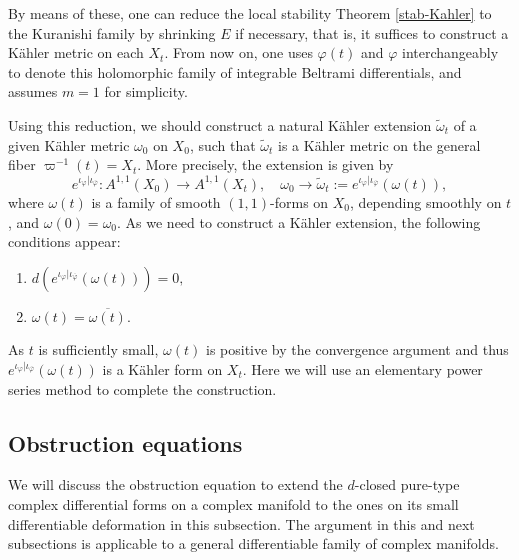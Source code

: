 \documentclass[12pt]{amsart}
\numberwithin{equation}{section}
\renewcommand{\1}{\mathds{1}}
\renewcommand{\>}{\rightarrow}
\def\o{\overline}
\begin{document}
By means of these, one can reduce the local stability Theorem \ref{stab-Kahler} to the Kuranishi family by shrinking $E$ if necessary, that is, it suffices to construct a K\"{a}hler metric on each $X_t$. From now on, one uses $\varphi(t)$ and  $\varphi$ interchangeably to denote this holomorphic family of integrable Beltrami differentials, and assumes $m=1$ for simplicity.

Using this reduction, we should
construct a natural K\"{a}hler extension $\tilde{\omega}_t$ of a given K\"{a}hler metric
$\omega_0$ on $X_0$, such that $\tilde{\omega}_t$ is a K\"{a}hler  metric on
the general fiber $\varpi^{-1}(t)=X_t$. More precisely, the extension
is given by
$$e^{\iota_{\varphi}|\iota_{\o{\varphi}}}:A^{1,1}(X_0)\to A^{1,1}(X_t),\quad \omega_0\to \tilde{\omega}_t:=e^{\iota_{\varphi}|\iota_{\o{\varphi}}}(\omega(t)),$$
where $\omega(t)$ is a family of smooth $(1,1)$-forms on $X_0$,
depending smoothly on $t$, and $\omega(0)=\omega_0$. As we need to
construct a K\"{a}hler extension, the following conditions appear:
\begin{enumerate}
  \item $d\left(e^{\iota_{\varphi}|\iota_{\o{\varphi}}}(\omega(t))\right)=0,$
  \item $\omega(t)=\o{\omega(t)}$.
\end{enumerate}
As $t$ is sufficiently small, $\omega(t)$ is positive by the
convergence argument and thus
$e^{\iota_{\varphi}|\iota_{\o{\varphi}}}(\omega(t))$ is a K\"{a}hler
form on $X_t$. Here we will use an elementary power series method to
complete the construction.

\subsection{Obstruction equations}
We will discuss the obstruction equation to extend the
$d$-closed pure-type complex differential forms on a complex manifold to the
ones on its
small differentiable deformation in this subsection. The argument in this and next subsections is applicable to a general differentiable family of complex manifolds.
\end{document}
